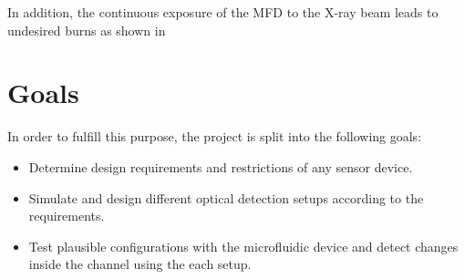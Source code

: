 \documentclass[../main.tex]{subfiles}%
\begin{document}
In addition, the continuous exposure of the \ac{MFD} to the X-ray beam leads to undesired burns as shown in %


\section{Goals}

In order to fulfill this purpose, the project is split into the following goals:

\begin{itemize}
	\item  Determine design requirements and restrictions of any sensor device.
	\item Simulate and design different optical detection setups according to the requirements.
	\item Test plausible configurations with the microfluidic device and detect changes inside the channel using the each setup.
\end{itemize}


\end{document}
